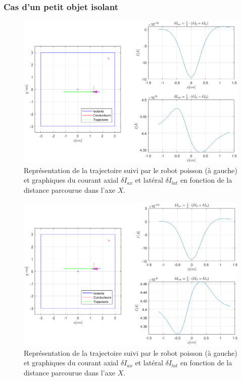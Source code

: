 \subsubsection{Cas d'un petit objet isolant}
\begin{figure}[h!]
    \centering
    \includegraphics[width=\textwidth]{assets/plot_currents/Table1/isolant_bas.png}
    \caption{Représentation de la trajectoire suivi par le robot poisson (à gauche) et graphiques du courant axial $\delta I_{ax}$ et latéral $\delta I_{lat}$ en fonction de la distance parcourue dans l'axe $X$.}
    \label{fig:isolant_bas}
\end{figure}
\begin{figure}[h!]
    \centering
    \includegraphics[width=\textwidth]{assets/plot_currents/Table1/isolant_haut.png}
    \caption{Représentation de la trajectoire suivi par le robot poisson (à gauche) et graphiques du courant axial $\delta I_{ax}$ et latéral $\delta I_{lat}$ en fonction de la distance parcourue dans l'axe $X$.}
    \label{fig:isolant_haut}
\end{figure}

